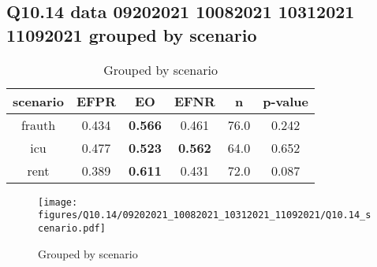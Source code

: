 \subsection{Q10.14 data 09202021 10082021 10312021 11092021 grouped by scenario}

\begin{comment}
            EFPR        EO      EFNR     n    pvalue
frauth  0.434211  0.565789  0.460526  76.0  0.242436
icu     0.476562  0.523438  0.562500  64.0  0.652186
rent    0.388889  0.611111  0.430556  72.0  0.086542
\end{comment}

\begin{table}[h]
    \centering
    \begin{tabular}{|c|c|c|c|c|c|}
        \hline
        scenario & EFPR & EO & EFNR & n & p-value\\
        \hline
        frauth & 0.434 & \textbf{0.566} & 0.461 & 76.0 & 0.242\\
		icu & 0.477 & \textbf{0.523} & \textbf{0.562} & 64.0 & 0.652\\
		rent & 0.389 & \textbf{0.611} & 0.431 & 72.0 & 0.087\\
		
        \hline
    \end{tabular}
    \caption{Grouped by scenario}
    \label{tab:my_label}
\end{table}
\begin{figure}[h]
    \centering
    \texttt{[image: figures/Q10.14/09202021\_10082021\_10312021\_11092021/Q10.14\_scenario.pdf]}
    \caption{Grouped by scenario}
    \label{fig:my_label}
\end{figure}
